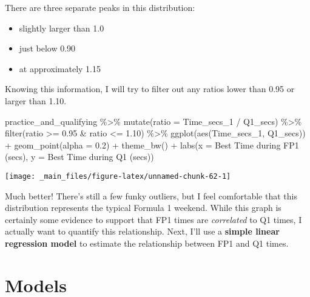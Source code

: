 \documentclass[
]{book}
\newenvironment{Shaded}{\begin{snugshade}}{\end{snugshade}}
\newcommand{\AttributeTok}[1]{\textcolor[rgb]{0.77,0.63,0.00}{#1}}
\newcommand{\FloatTok}[1]{\textcolor[rgb]{0.00,0.00,0.81}{#1}}
\newcommand{\FunctionTok}[1]{\textcolor[rgb]{0.00,0.00,0.00}{#1}}
\newcommand{\NormalTok}[1]{#1}
\newcommand{\SpecialCharTok}[1]{\textcolor[rgb]{0.00,0.00,0.00}{#1}}
\newcommand{\StringTok}[1]{\textcolor[rgb]{0.31,0.60,0.02}{#1}}
\providecommand{\tightlist}{%
  \setlength{\itemsep}{0pt}\setlength{\parskip}{0pt}}
\begin{document}
There are three separate peaks in this distribution:

\begin{itemize}
\tightlist
\item
  slightly larger than 1.0
\item
  just below 0.90
\item
  at approximately 1.15
\end{itemize}

Knowing this information, I will try to filter out any ratios lower than 0.95 or larger than 1.10.

\begin{Shaded}
\begin{Highlighting}[]
\NormalTok{practice\_and\_qualifying }\SpecialCharTok{\%\textgreater{}\%}
  \FunctionTok{mutate}\NormalTok{(}\AttributeTok{ratio =}\NormalTok{ Time\_secs\_1 }\SpecialCharTok{/}\NormalTok{ Q1\_secs) }\SpecialCharTok{\%\textgreater{}\%} 
  \FunctionTok{filter}\NormalTok{(ratio }\SpecialCharTok{\textgreater{}=} \FloatTok{0.95} \SpecialCharTok{\&}\NormalTok{ ratio }\SpecialCharTok{\textless{}=} \FloatTok{1.10}\NormalTok{) }\SpecialCharTok{\%\textgreater{}\%} 
  \FunctionTok{ggplot}\NormalTok{(}\FunctionTok{aes}\NormalTok{(Time\_secs\_1, Q1\_secs)) }\SpecialCharTok{+}
  \FunctionTok{geom\_point}\NormalTok{(}\AttributeTok{alpha =} \FloatTok{0.2}\NormalTok{) }\SpecialCharTok{+}
  \FunctionTok{theme\_bw}\NormalTok{() }\SpecialCharTok{+}
  \FunctionTok{labs}\NormalTok{(}\AttributeTok{x =} \StringTok{\textquotesingle{}Best Time during FP1 (secs)\textquotesingle{}}\NormalTok{,}
       \AttributeTok{y =} \StringTok{\textquotesingle{}Best Time during Q1 (secs)\textquotesingle{}}\NormalTok{)}
\end{Highlighting}
\end{Shaded}

\begin{center}\texttt{[image: \_main\_files/figure-latex/unnamed-chunk-62-1]} \end{center}

Much better! There's still a few funky outliers, but I feel comfortable that this distribution represents the typical Formula 1 weekend. While this graph is certainly some evidence to support that FP1 times are \emph{correlated} to Q1 times, I actually want to quantify this relationship. Next, I'll use a \textbf{simple linear regression model} to estimate the relationship between FP1 and Q1 times.

\hypertarget{models}{%
\section{Models}\label{models}}
\end{document}
